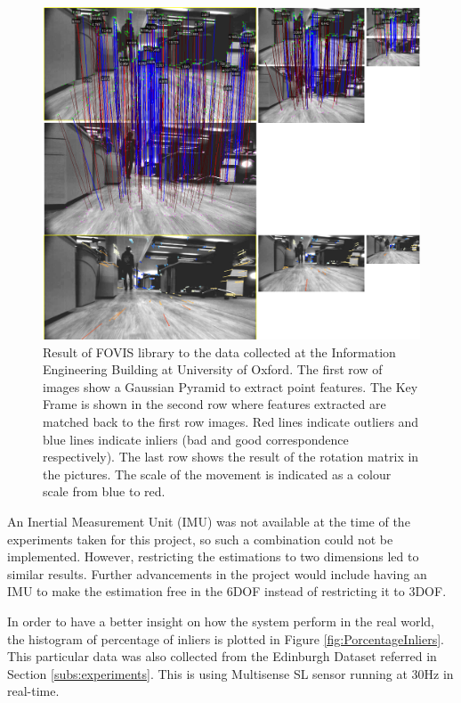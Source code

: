 \documentclass[11pt]{article}
\begin{document}
\begin{figure}
\begin{minipage}{0.65\textwidth}
\centering
\includegraphics[width=\textwidth]{VisualOdometry1}
\end{minipage} \hfill
\begin{minipage}{0.35\textwidth}
\centering
\caption[t]{Result of FOVIS library to the data collected at the Information Engineering Building at University of Oxford. The first row of images show a Gaussian Pyramid to extract point features. The Key Frame is shown in the second row where features extracted are matched back to the first row images. Red lines indicate outliers and blue lines indicate inliers (bad and good correspondence respectively). The last row shows the result of the rotation matrix in the pictures. The scale of the movement is indicated as a colour scale from blue to red.}
\label{fig:VisualOdometry1}	
\end{minipage}				
\end{figure}

An Inertial Measurement Unit (IMU) was not available at the time of the experiments taken for this project, so such a combination could not be implemented. However, restricting the estimations to two dimensions led to similar results. Further advancements in the project would include having an IMU to make the estimation free in the 6DOF instead of restricting it to 3DOF.

In order to have a better insight on how the system perform in the real world, the histogram of percentage of inliers is plotted in Figure \ref{fig:PorcentageInliers}. This particular data was also collected from the Edinburgh Dataset referred in Section \ref{subs:experiments}. This is using Multisense SL sensor running at 30Hz in real-time.
\end{document}
